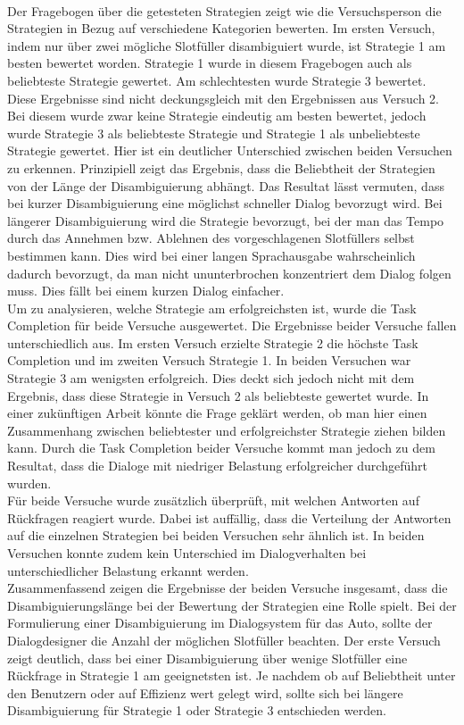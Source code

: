 \documentclass[12pt,a4paper]{scrartcl}
\begin{document}
\\
Der Fragebogen über die getesteten Strategien zeigt wie die Versuchsperson die Strategien in Bezug auf verschiedene Kategorien bewerten. Im ersten Versuch, indem nur über zwei mögliche Slotfüller disambiguiert wurde, ist Strategie 1 am besten bewertet worden. Strategie 1 wurde in diesem Fragebogen auch als beliebteste Strategie gewertet. Am schlechtesten wurde Strategie 3 bewertet. Diese Ergebnisse sind nicht deckungsgleich mit den Ergebnissen aus Versuch 2. Bei diesem wurde zwar keine Strategie eindeutig am besten bewertet, jedoch wurde Strategie 3 als beliebteste Strategie und Strategie 1 als unbeliebteste Strategie gewertet. Hier ist ein deutlicher Unterschied zwischen beiden Versuchen zu erkennen. Prinzipiell zeigt das Ergebnis, dass die Beliebtheit der Strategien von der Länge der Disambiguierung abhängt. Das Resultat lässt vermuten, dass bei kurzer Disambiguierung eine möglichst schneller Dialog bevorzugt wird. Bei längerer Disambiguierung wird die Strategie bevorzugt, bei der man das Tempo durch das Annehmen bzw. Ablehnen des vorgeschlagenen Slotfüllers selbst bestimmen kann. Dies wird bei einer langen Sprachausgabe wahrscheinlich dadurch bevorzugt, da man nicht ununterbrochen konzentriert dem Dialog folgen muss. Dies fällt bei einem kurzen Dialog einfacher. \\
\newline
Um zu analysieren, welche Strategie am erfolgreichsten ist, wurde die Task Completion für beide Versuche ausgewertet. Die Ergebnisse beider Versuche fallen unterschiedlich aus. Im ersten Versuch erzielte Strategie 2 die höchste Task Completion und im zweiten Versuch Strategie 1. In beiden Versuchen war Strategie 3 am wenigsten erfolgreich. Dies deckt sich jedoch nicht mit dem Ergebnis, dass diese Strategie in Versuch 2 als beliebteste gewertet wurde. In einer zukünftigen Arbeit könnte die Frage geklärt werden, ob man hier einen Zusammenhang zwischen beliebtester und erfolgreichster Strategie ziehen bilden kann. 
Durch die Task Completion beider Versuche kommt man jedoch zu dem Resultat, dass die Dialoge mit niedriger Belastung erfolgreicher durchgeführt wurden. \\
\newline
Für beide Versuche wurde zusätzlich überprüft, mit welchen Antworten auf Rückfragen reagiert wurde. Dabei ist auffällig, dass die Verteilung der Antworten auf die einzelnen Strategien bei beiden Versuchen sehr ähnlich ist. In beiden Versuchen konnte zudem kein Unterschied im Dialogverhalten bei unterschiedlicher Belastung erkannt werden. \\
\newline
Zusammenfassend zeigen die Ergebnisse der beiden Versuche insgesamt, dass die Disambiguierungslänge bei der Bewertung der Strategien eine Rolle spielt. Bei der Formulierung einer Disambiguierung im Dialogsystem für das Auto, sollte der Dialogdesigner die Anzahl der möglichen Slotfüller beachten. Der erste Versuch zeigt deutlich, dass bei einer Disambiguierung über wenige Slotfüller eine Rückfrage in Strategie 1 am geeignetsten ist. Je nachdem ob auf Beliebtheit unter den Benutzern oder auf Effizienz  wert gelegt wird, sollte sich bei längere Disambiguierung für Strategie 1 oder Strategie 3 entschieden werden. 
\end{document}
